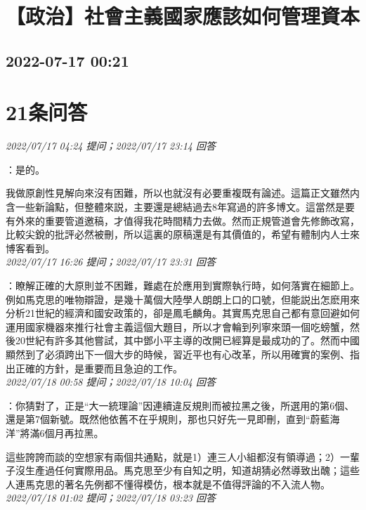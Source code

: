 \documentclass[twocolumn]{ctexart}
\begin{document}
\section{【政治】社會主義國家應該如何管理資本}
\subsection{2022-07-17 00:21}


\section{21条问答}

\textit{\hfill\noindent\small 2022/07/17 04:24 提问；2022/07/17 23:14 回答}

：是的。

我做原創性見解向來沒有困難，所以也就沒有必要重複既有論述。這篇正文雖然内含一些新論點，但整體來説，主要還是總結過去8年寫過的許多博文。這當然是要有外來的重要管道邀稿，才值得我花時間精力去做。然而正規管道會先修飾改寫，比較尖銳的批評必然被刪，所以這裏的原稿還是有其價值的，希望有體制内人士來博客看到。
\\

\textit{\hfill\noindent\small 2022/07/17 16:26 提问；2022/07/17 23:31 回答}

：瞭解正確的大原則並不困難，難處在於應用到實際執行時，如何落實在細節上。例如馬克思的唯物辯證，是幾十萬個大陸學人朗朗上口的口號，但能説出怎麽用來分析21世紀的經濟和國安政策的，卻是鳳毛麟角。其實馬克思自己都有意回避如何運用國家機器來推行社會主義這個大題目，所以才會輪到列寧來頭一個吃螃蟹，然後20世紀有許多其他嘗試，其中鄧小平主導的改開已經算是最成功的了。然而中國顯然到了必須跨出下一個大步的時候，習近平也有心改革，所以用確實的案例、指出正確的方針，是重要而且急迫的工作。
\\

\textit{\hfill\noindent\small 2022/07/18 00:58 提问；2022/07/18 10:04 回答}

：你猜對了，正是“大一統理論”因連續違反規則而被拉黑之後，所選用的第6個、還是第7個新號。既然他依舊不在乎規則，那也只好先一見即刪，直到“蔚藍海洋”將滿6個月再拉黑。

這些誇誇而談的空想家有兩個共通點，就是1）連三人小組都沒有領導過；2）一輩子沒生產過任何實際用品。馬克思至少有自知之明，知道胡猜必然導致出醜；這些人連馬克思的著名先例都不懂得模仿，根本就是不值得評論的不入流人物。
\\

\textit{\hfill\noindent\small 2022/07/18 01:02 提问；2022/07/18 03:23 回答}
\end{document}
